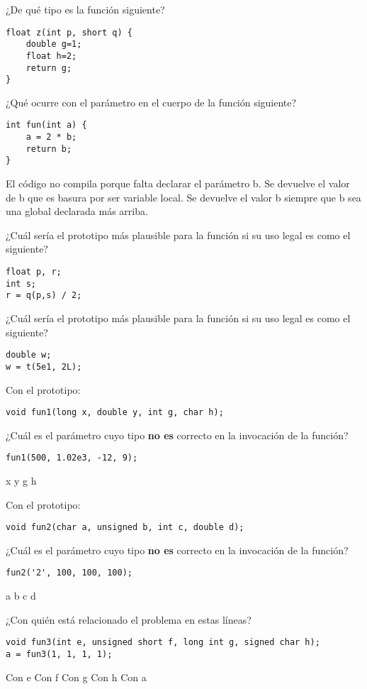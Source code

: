 \begin{preguntas}
\question ¿De qué tipo es la función siguiente?
\begin{lstlisting}
float z(int p, short q) {
	double g=1;
	float h=2;
	return g;
}
\end{lstlisting}
\choice {}
\correctchoice {}
\choice {}
\choice {}

\question ¿Qué ocurre con el parámetro  en el cuerpo de la función siguiente?
\begin{lstlisting}
int fun(int a) {
	a = 2 * b;
	return b;
}
\end{lstlisting} 
\choice El código no compila porque falta declarar el parámetro b.
\choice Se devuelve el valor de b que es basura por ser variable local.
\correctchoice Se devuelve el valor b siempre que b sea una global declarada más arriba.

\question ¿Cuál sería el prototipo más plausible para la función  si su uso legal es como el siguiente?
\begin{lstlisting}
float p, r; 
int s;
r = q(p,s) / 2;	
\end{lstlisting}
\correctchoice {}
\choice {}
\choice {}

\question ¿Cuál sería el prototipo más plausible para la función  si su uso legal es como el siguiente?
\begin{lstlisting}
double w;
w = t(5e1, 2L);
\end{lstlisting}
\choice {}
\choice {}
\correctchoice {}
\choice {}

\question Con el prototipo:
\begin{lstlisting}
void fun1(long x, double y, int g, char h);
\end{lstlisting}
¿Cuál es el parámetro cuyo tipo \textbf{no es} correcto en la invocación de la función?
\begin{lstlisting}
fun1(500, 1.02e3, -12, 9);
\end{lstlisting}
\correctchoice x
\choice y
\choice g
\choice h

\question Con el prototipo:
\begin{lstlisting}
void fun2(char a, unsigned b, int c, double d);
\end{lstlisting}
¿Cuál es el parámetro cuyo tipo \textbf{no es} correcto en la invocación de la función?
\begin{lstlisting}
fun2('2', 100, 100, 100);
\end{lstlisting}
\choice a
\choice b
\choice c
\correctchoice d

\question ¿Con quién está relacionado el problema en estas líneas?
\begin{lstlisting}
void fun3(int e, unsigned short f, long int g, signed char h);
a = fun3(1, 1, 1, 1);
\end{lstlisting}
\choice Con e
\choice Con f
\choice Con g
\choice Con h
\correctchoice Con a

\end{preguntas}
